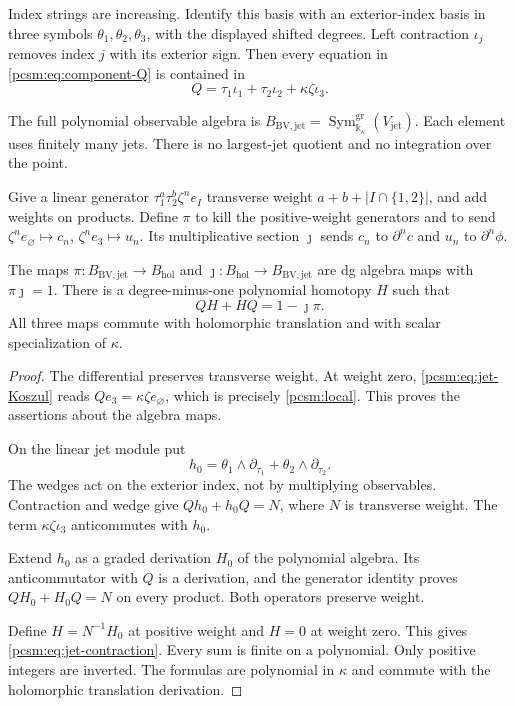 Index strings are increasing.
Identify this basis with an exterior-index basis in three symbols
\(\theta_1,\theta_2,\theta_3\), with the displayed shifted degrees.
Left contraction \(\iota_j\) removes index \(j\) with its exterior
sign. Then every equation in \eqref{pcsm:eq:component-Q} is contained in
\begin{equation}\label{pcsm:eq:jet-Koszul}
 Q=\tau_1\iota_1+\tau_2\iota_2+\kappa\zeta\iota_3.
\end{equation}

The\label{pcsm:def:polynomial-bv-jets} full polynomial observable algebra is
\(B_{\mathrm{BV,jet}}=\operatorname{Sym}^{\mathrm{gr}}_{
\mathbb k_\kappa}(V_{\mathrm{jet}})\).
Each element uses finitely many jets. There is no largest-jet quotient
and no integration over the point.

Give\label{pcsm:def:jet-projection} a linear generator \(\tau_1^a\tau_2^b\zeta^n e_I\)
transverse weight \(a+b+|I\cap\{1,2\}|\), and add weights on
products. Define \(\pi\) to kill the positive-weight generators and
to send
\(\zeta^ne_\varnothing\mapsto c_n\),
\(\zeta^ne_3\mapsto u_n\).
Its multiplicative section \(\jmath\) sends \(c_n\) to
\(\partial^nc\) and \(u_n\) to \(\partial^n\phi\).

\begin{proposition}
\label{pcsm:prop:component-jets}
The maps \(\pi:B_{\mathrm{BV,jet}}\to B_{\mathrm{hol}}\) and
\(\jmath:B_{\mathrm{hol}}\to B_{\mathrm{BV,jet}}\) are dg algebra
maps with \(\pi\jmath=1\).
There is a degree-minus-one polynomial homotopy \(H\) such that
\begin{equation}\label{pcsm:eq:jet-contraction}
 QH+HQ=1-\jmath\pi.
\end{equation}
All three maps commute with holomorphic translation and with scalar
specialization of \(\kappa\).
\end{proposition}

\begin{proof}
The differential preserves transverse weight.
At weight zero, \eqref{pcsm:eq:jet-Koszul} reads
\(Qe_3=\kappa\zeta e_\varnothing\), which is precisely
\eqref{pcsm:local}. This proves the assertions about the algebra maps.

On the linear jet module put
\[
 h_0=\theta_1\wedge\partial_{\tau_1}
                      +\theta_2\wedge\partial_{\tau_2}.
\]
The wedges act on the exterior index, not by multiplying observables.
Contraction and wedge give \(Qh_0+h_0Q=N\), where \(N\)
is transverse weight. The term \(\kappa\zeta\iota_3\)
anticommutes with \(h_0\).

Extend \(h_0\) as a graded derivation \(H_0\) of the polynomial
algebra. Its anticommutator with \(Q\) is a derivation, and the
generator identity proves \(QH_0+H_0Q=N\) on every product.
Both operators preserve weight.

Define \(H=N^{-1}H_0\) at
positive weight and \(H=0\) at weight zero.
This gives \eqref{pcsm:eq:jet-contraction}.
Every sum is finite on a polynomial. Only positive integers are
inverted. The formulas are polynomial in \(\kappa\) and commute
with the holomorphic translation derivation.
\end{proof}

